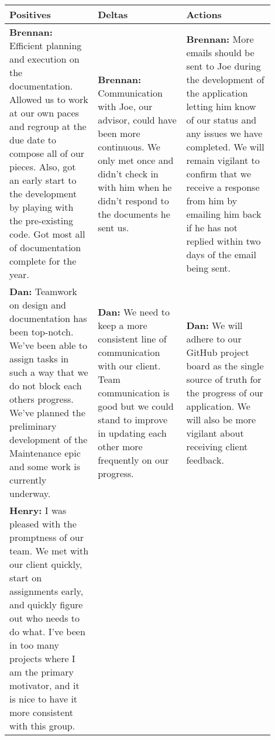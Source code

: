 \documentclass[draftclsnofoot,onecolumn,journal,letterpaper,compsoc,10pt]{IEEEtran}
\begin{document}
\vspace{2mm}
\begin{center}
    \begin{tabular}{|p{0.3\linewidth}|p{0.3\linewidth}|p{0.3\linewidth}|}
        \hline Positives & Deltas & Actions \\
        \hline
            {\bf Brennan:}\newline
            Efficient planning and execution on the documentation.  Allowed us to work at our own paces and regroup at the due date to compose all of our pieces.  Also, got an early start to the development by playing with the pre-existing code. Got most all of documentation complete for the year. &
            {\bf Brennan:}\newline
            Communication with Joe, our advisor, could have been more continuous.  We only met once and didn't check in with him when he didn't respond to the documents he sent us. &
            {\bf Brennan:}\newline
            More emails should be sent to Joe during the development of the application letting him know of our status and any issues we have completed.  We will remain vigilant to confirm that we receive a response from him by emailing him back if he has not replied within two days of the email being sent. \\
        \hline
            {\bf Dan:}\newline
            Teamwork on design and documentation has been top-notch. We've been able to assign tasks in such a way that we do not block each others progress. We've planned the preliminary development of the Maintenance epic and some work is currently underway. &
            {\bf Dan:}\newline
            We need to keep a more consistent line of communication with our client. Team communication is good but we could stand to improve in updating each other more frequently on our progress. &
            {\bf Dan:}\newline
            We will adhere to our GitHub project board as the single source of truth for the progress of our application. We will also be more vigilant about receiving client feedback.  \\
        \hline
            {\bf Henry:}\newline
                I was pleased with the promptness of our team. We met with our client quickly, start on assignments early, and quickly figure out who needs to do what. I've been in too many projects where I am the primary motivator, and it is nice to have it more consistent with this group. &

\end{tabular}
\end{center}
\end{document}
